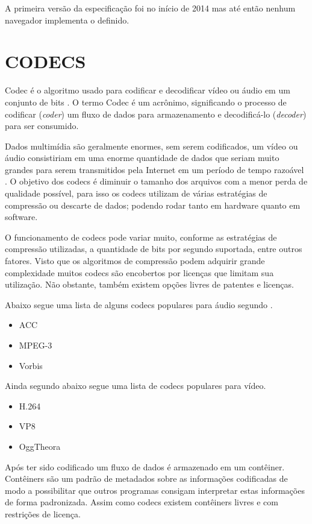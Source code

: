 A primeira versão da especificação foi no início de 2014 mas até
então nenhum navegador implementa o definido.
\section{CODECS}

Codec é o algoritmo usado para codificar e decodificar vídeo ou
áudio em um conjunto de bits \autocite{diveIntohtml}. O termo Codec é
um acrônimo, significando o processo de codificar (\textit{coder}) um fluxo de dados
para armazenamento e decodificá-lo (\textit{decoder}) para ser consumido.

Dados multimídia são geralmente enormes, sem serem codificados,
um vídeo ou áudio consistiriam em uma enorme quantidade de dados
que seriam muito grandes para serem transmitidos pela Internet em um
período de tempo razoável \autocite[pp. 66]{proHtml5}. O objetivo dos
codecs é diminuir o tamanho dos arquivos com a menor perda de qualidade
possível, para isso os codecs utilizam de várias estratégias de
compressão ou descarte de dados; podendo rodar tanto em hardware quanto
em software.

O funcionamento de codecs pode variar muito, conforme as estratégias de
compressão utilizadas, a quantidade de bits por segundo suportada, entre outros
fatores. Visto que os algoritmos de compressão podem adquirir grande
complexidade muitos codecs são encobertos por licenças
que limitam sua utilização. Não obstante, também existem opções
livres de patentes e licenças.

Abaixo segue uma lista de alguns codecs populares para áudio segundo \cite[pp. 67]{proHtml5}.

\begin{itemize}
    \item ACC
    \item MPEG-3
    \item Vorbis
\end{itemize}

Ainda segundo \cite[pp. 67]{proHtml5} abaixo segue uma lista de codecs populares para vídeo.
\begin{itemize}
    \item H.264
    \item VP8
    \item OggTheora
\end{itemize}

Após ter sido codificado um fluxo de dados é armazenado em um
contêiner. Contêiners são um padrão de metadados sobre as informações
codificadas de modo a possibilitar que outros programas consigam
interpretar estas informações de forma padronizada. Assim como
codecs existem contêiners livres e com restrições de licença.


